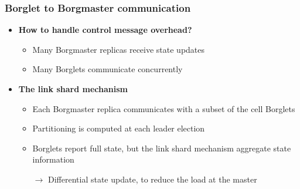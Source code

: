 \begin{frame}
\frametitle{Borglet to Borgmaster communication}
\begin{itemize}
	\item {\bf How to handle control message overhead?}
	\begin{itemize}
		\item Many Borgmaster replicas receive state updates
		\item Many Borglets communicate concurrently
	\end{itemize}

\vspace{20pt}

	\item {\bf The link shard mechanism}
	\begin{itemize}
		\item Each Borgmaster replica communicates with a subset of the cell Borglets
		\item Partitioning is computed at each leader election
		\item Borglets report full state, but the link shard mechanism aggregate state information
		\item[$\to$] Differential state update, to reduce the load at the master
	\end{itemize}
\end{itemize}
\end{frame}

